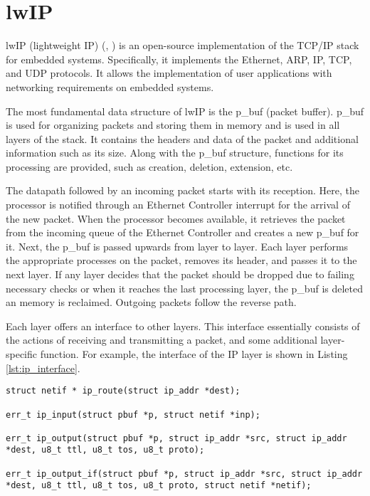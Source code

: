 
\section{lwIP}
lwIP (lightweight IP) (\cite{lwip_docs}, \cite{lwip_wiki}) is an open-source implementation of the TCP/IP stack for embedded systems. Specifically, it implements the Ethernet, ARP, IP, TCP, and UDP protocols. It allows the implementation of user applications with networking requirements on embedded systems.

The most fundamental data structure of lwIP is the p\_buf (packet buffer). p\_buf is used for organizing packets and storing them in memory and is used in all layers of the stack. It contains the headers and data of the packet and additional information such as its size. Along with the p\_buf structure, functions for its processing are provided, such as creation, deletion, extension, etc.

The datapath followed by an incoming packet starts with its reception. Here, the processor is notified through an Ethernet Controller interrupt for the arrival of the new packet. When the processor becomes available, it retrieves the packet from the incoming queue of the Ethernet Controller and creates a new p\_buf for it. Next, the p\_buf is passed upwards from layer to layer. Each layer performs the appropriate processes on the packet, removes its header, and passes it to the next layer. If any layer decides that the packet should be dropped due to failing necessary checks or when it reaches the last processing layer, the p\_buf is deleted an memory is reclaimed. Outgoing packets follow the reverse path.

Each layer offers an interface to other layers. This interface essentially consists of the actions of receiving and transmitting a packet, and some additional layer-specific function. For example, the interface of the IP layer is shown in Listing \ref{lst:ip_interface}.\\

\noindent
\begin{minipage}{\linewidth}
\begin{lstlisting}[style=mycodestyle, label={lst:ip_interface}, caption={IP layer's interface in lwIP}]
struct netif * ip_route(struct ip_addr *dest);

err_t ip_input(struct pbuf *p, struct netif *inp);

err_t ip_output(struct pbuf *p, struct ip_addr *src, struct ip_addr *dest, u8_t ttl, u8_t tos, u8_t proto);

err_t ip_output_if(struct pbuf *p, struct ip_addr *src, struct ip_addr *dest, u8_t ttl, u8_t tos, u8_t proto, struct netif *netif);
\end{lstlisting}
\end{minipage}\\


